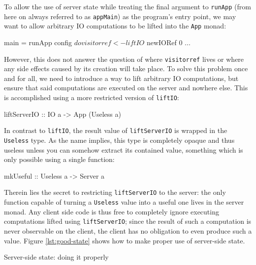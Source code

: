 \documentclass[preprint]{sigplanconf}
\begin{document}
To allow the use of server state while treating the final argument to
\lstinline!runApp! (from here on always referred to as \lstinline!appMain!)
as the program's entry point, we may want to allow arbitrary IO computations to
be lifted into the \lstinline!App! monad:

\begin{code}
main = runApp config $ do
  visitorref <- liftIO $ newIORef 0
  ...
\end{code}

However, this does not answer the question of where \lstinline!visitorref!
lives or where any side effects caused by its creation will take place.
To solve this problem once and for all, we need to introduce a way to lift
arbitrary IO computations, but ensure that said computations are executed on
the server and nowhere else. This is accomplished using a more restricted
version of \lstinline!liftIO!:

\begin{code}
liftServerIO :: IO a -> App (Useless a)
\end{code}

In contrast to \lstinline!liftIO!, the result value of \lstinline!liftServerIO!
is wrapped in the \lstinline!Useless! type. As the name implies, this type is
completely opaque and thus useless unless you can somehow extract its contained
value, something which is only possible using a single function:

\begin{code}
mkUseful :: Useless a -> Server a
\end{code}

Therein lies the secret to restricting \lstinline!liftServerIO! to the
server: the only function capable of turning a \lstinline!Useless! value into
a useful one lives in the server monad. Any client side code is thus free to
completely ignore executing computations lifted using \lstinline!liftServerIO!;
since the result of such a computation is never observable on the client,
the client has no obligation to even produce such a value.
Figure \ref{lst:good-state} shows how to make proper use of server-side state.

\begin{listingfloat}
\caption{Server-side state: doing it properly}
\label{lst:good-state}
\end{listingfloat}
\end{document}
